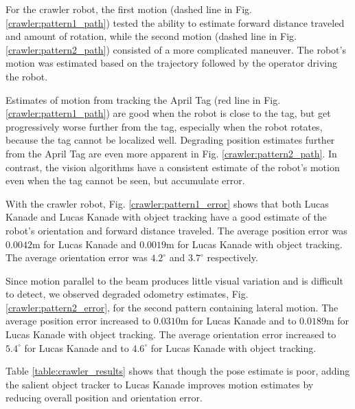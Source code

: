 \documentclass[letterpaper, 10 pt, conference]{ieeeconf}
\begin{document}
For the crawler robot, the first motion (dashed line in Fig. \ref{crawler:pattern1_path}) tested the ability to estimate forward distance traveled and amount of rotation, while the second motion  (dashed line in Fig. \ref{crawler:pattern2_path}) consisted of a more complicated maneuver. The robot's motion was estimated based on the trajectory followed by the operator driving the robot.

Estimates of motion from tracking the April Tag (red line in Fig. \ref{crawler:pattern1_path}) are good when the robot is close to the tag, but get progressively worse further from the tag, especially when the robot rotates, because the tag cannot be localized well. Degrading position estimates further from the April Tag are even more apparent in Fig. \ref{crawler:pattern2_path}. In contrast, the vision algorithms have a consistent estimate of the robot's motion even when the tag cannot be seen, but accumulate error. 

With the crawler robot, Fig. \ref{crawler:pattern1_error} shows that both Lucas Kanade and Lucas Kanade with object tracking have a good estimate of the robot's orientation and forward distance traveled. The average position error was $0.0042$m for Lucas Kanade and $0.0019$m for Lucas Kanade with object tracking. The average orientation error was $4.2^{\circ}$ and $3.7^{\circ}$ respectively. 

Since motion parallel to the beam produces little visual variation and is difficult to detect, we observed degraded odometry estimates, Fig. \ref{crawler:pattern2_error}, for the second pattern containing lateral motion. The average position error increased to $0.0310$m for Lucas Kanade and to $0.0189$m for Lucas Kanade with object tracking. The average orientation error increased to $5.4^{\circ}$ for Lucas Kanade and to $4.6^{\circ}$ for Lucas Kanade with object tracking.

Table \ref{table:crawler_results} shows that though the pose estimate is poor, adding the salient object tracker to Lucas Kanade improves motion estimates by reducing overall position and orientation error.
\end{document}
